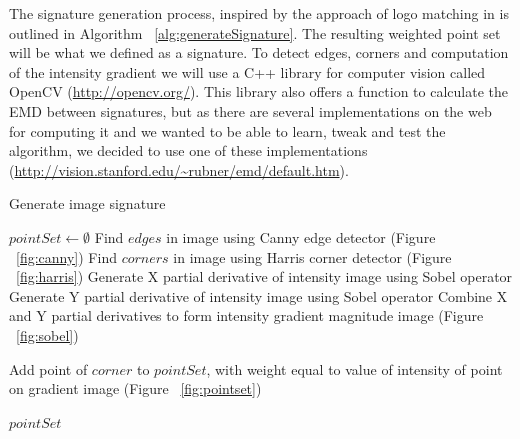 \documentclass[10pt,a4paper]{article}
\begin{document}
The signature generation process, inspired by the approach of logo matching in \cite{panos05} is outlined in Algorithm ~\ref{alg:generateSignature}. The resulting weighted point set will be what we defined as a signature. To detect edges, corners and computation of the intensity gradient we will use a C++ library for computer vision called OpenCV (\url{http://opencv.org/}). This library also offers a function to calculate the EMD between signatures, but as there are several implementations on the web for computing it and we wanted to be able to learn, tweak and test the algorithm, we decided to use one of these implementations (\url{http://vision.stanford.edu/~rubner/emd/default.htm}).

\begin{algorithm}
\caption{Generate image signature}
\label{alg:generateSignature}
\begin{algorithmic} 
\State $pointSet \gets \emptyset$
\State Find $edges$ in image using Canny edge detector  (Figure ~\ref{fig:canny})
\State Find $corners$ in image using Harris corner detector  (Figure ~\ref{fig:harris})
\State Generate X partial derivative of intensity image using Sobel operator
\State Generate Y partial derivative of intensity image using Sobel operator
\State Combine X and Y partial derivatives to form intensity gradient magnitude image  (Figure ~\ref{fig:sobel})

   \State Add point of $corner$ to $pointSet$, with weight equal to value of intensity of point on gradient image  (Figure ~\ref{fig:pointset})
 \EndIf  
\EndFor


\Return $pointSet$

\end{algorithmic}
\end{algorithm}
\end{document}
